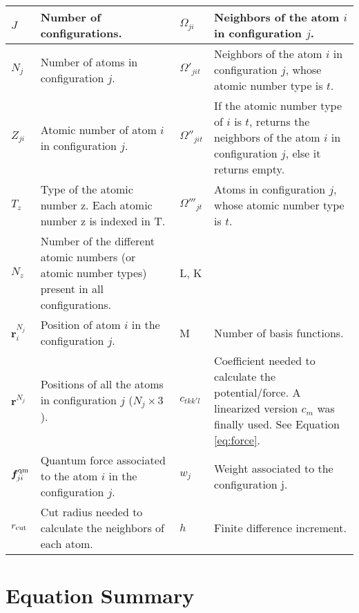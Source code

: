 \documentclass[12pt]{article}
\begin{document}
\begin{center}
    \label{table:def}
    \begin{tabular}{ | l | p{7.5cm} | l | p{7.5cm} |}
    \hline
    $J$ & Number of configurations. & $\Omega_{ji}$ & Neighbors of the atom $i$ in configuration $j$. \\ \hline
    
    $N_j$ & Number of atoms in configuration $j$. & $\Omega'_{jit}$ & Neighbors of the atom $i$ in configuration $j$, whose atomic number type is $t$. \\ \hline
    
    $Z_{ji}$ & Atomic number of atom $i$ in configuration $j$. & $\Omega''_{jit}$ & If the atomic number type of $i$ is $t$, returns the neighbors of the atom $i$ in configuration $j$, else it returns empty. \\ \hline
    
    $T_z$ & Type of the atomic number z. Each atomic number z is indexed in T. & $\Omega'''_{jt}$ & Atoms in configuration $j$, whose atomic number type is $t$. \\ \hline
    
    $N_z$ & Number of the different atomic numbers (or atomic number types) present in all configurations. &  L, K &  \\ \hline
    
    $\bm {r}^{N_j}_{i}$ & Position of atom $i$ in the configuration $j$. & M & Number of basis functions.\\ \hline
    
    $\bm {r}^{N_j}$ & Positions of all the atoms in configuration $j$ ($N_j \times 3$). & $c_{tkk'l}$  & Coefficient needed to calculate the potential/force. A linearized version $c_{m}$ was finally used. See Equation \ref{eq:force}.\\ \hline %
    
    $\bm f^{\rm qm}_{ji}$ & Quantum force associated to the atom $i$ in the configuration $j$. & $w_j$ & Weight associated to the configuration j. \\ \hline
    
    $r_{\rm cut}$ & Cut radius needed to calculate the neighbors of each atom. &  $h$ & Finite difference increment. \\
    \hline
    \end{tabular}
\end{center}

\section{Equation Summary}
\end{document}
